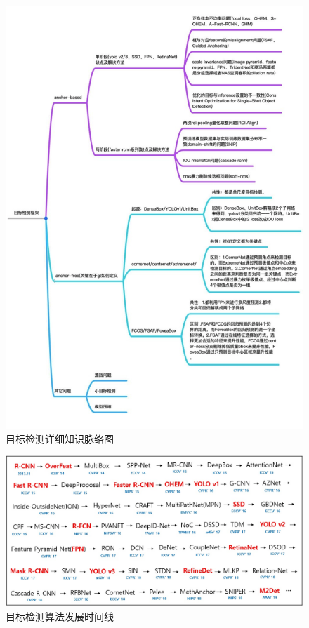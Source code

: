 \documentclass[lang=cn,11pt,a4paper]{elegant_template}
\begin{document}
\begin{figure}[htbp]
  \centering
  \vspace*{-3cm}
  \includegraphics[scale=0.3, angle=90]{image/cv_3.png}
  \caption{目标检测详细知识脉络图}
\end{figure}

\begin{figure}[htbp]
  \centering
  \vspace*{-4cm}
  \includegraphics[scale=0.35]{image/cv_4.jpg}
  \caption{目标检测算法发展时间线}
\end{figure}
\end{document}
